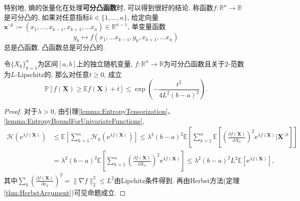 特别地, 熵的张量化在处理\textbf{可分凸函数}时, 可以得到很好的结论. 
称函数$f \colon \mathbb{R}^n \to \mathbb{R}$是可分凸的, 如果对任意指标$k \in \{1, \dots, n\}$, 给定向量$\bm{x}^{\backslash k} := (x_1, \dots, x_{k-1}, x_{k+1}, \dots x_n) \in \mathbb{R}^{n-1}$, 单变量函数
\begin{equation*}
	y_k \mapsto f(x_1, \dots x_{k-1}, y_k, x_{k+1}, \dots x_n)
\end{equation*}
总是凸函数. 
凸函数总是可分凸的. 

\begin{proposition}\label{prop:separatelyConvexBd}
	令$\{X_k\}_{k=1}^n$为区间$[a, b]$上的独立随机变量, $f \colon \mathbb{R}^n \to \mathbb{R}$为可分凸函数且关于$2$-范数为$L$-Lipschitz的, 那么对任意$t \geq 0$, 成立
	\begin{equation*}
		\mathbb{P}[f(\bm{X}) \geq \mathbb{E}f(\bm{X}) + t] 
		\leq \exp \left( - \frac{t^2}{4L^2 (b-a)^2} \right). 
	\end{equation*}	
\end{proposition}
\begin{proof}
	对于$\lambda > 0$, 由引理\ref{lemma:EntropyTensorization}、 \ref{lemma:EntropyBoundForUnivariateFunctions}, 
	\begin{align*}
		\mathcal{H}(\mathrm{e}^{\lambda f(\bm{X})})
		&\leq \mathbb{E}\left[ \sum_{k=1}^n \mathcal{H}_k (\mathrm{e}^{\lambda f(\bm{X})}) \right]
		\leq \lambda^2 (b-a)^2  \mathbb{E}\left[ \sum_{k=1}^n \mathbb{E}\left[ \left(\frac{\partial f(\bm{X})}{\partial X_k} \right)^2 \mathrm{e}^{\lambda f(\bm{X})} \bigg| \bm{X}^{\backslash k} \right] \right] \\
		&= \lambda^2 (b-a)^2  \mathbb{E}\left[ \sum_{k=1}^n \left(\frac{\partial f(\bm{X})}{\partial X_k} \right)^2 \mathrm{e}^{\lambda f(\bm{X})}\right]
		\leq \lambda^2 (b-a)^2 L^2 \mathbb{E}[\mathrm{e}^{\lambda f(\bm{X})}], 
	\end{align*}
	其中$\sum_k \left( \frac{\partial f(\bm{X})}{\partial x_k} \right)^2 = \|\nabla f\|_2^2 \leq L^2$由Lipchitz条件得到. 
	再由Herbst方法(定理\ref{thm:HerbstArgument})可见命题成立. 
\end{proof}

